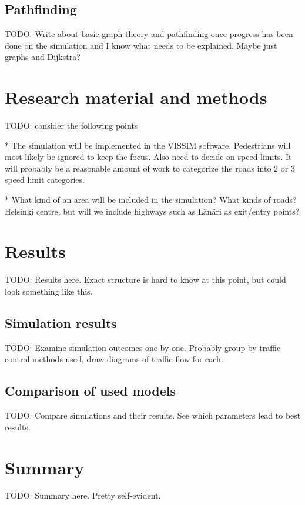 \documentclass[english, 12pt, a4paper, elec, utf8, pdfa, online]{aaltothesis}
\begin{document}
\subsection{Pathfinding}

TODO: Write about basic graph theory and pathfinding once progress has been done on the simulation and I know what needs to be explained. Maybe just graphs and Dijkstra?

\clearpage

\section{Research material and methods}

TODO: consider the following points

* The simulation will be implemented in the VISSIM software. Pedestrians will most likely be ignored to keep the focus. Also need to decide on speed limits. It will probably be a reasonable amount of work to categorize the roads into 2 or 3 speed limit categories.

* What kind of an area will be included in the simulation? What kinds of roads? Helsinki centre, but will we include highways such as Länäri as exit/entry points?

\clearpage

\section{Results}

TODO: Results here. Exact structure is hard to know at this point, but could look something like this.

\subsection{Simulation results}

TODO: Examine simulation outcomes one-by-one. Probably group by traffic control methods used, draw diagrams of traffic flow for each.

\subsection{Comparison of used models}

TODO: Compare simulations and their results. See which parameters lead to best results.

\clearpage

\section{Summary}

TODO: Summary here. Pretty self-evident.

\clearpage

\thesisbibliography

{}


\clearpage

\thesisappendix
\end{document}
